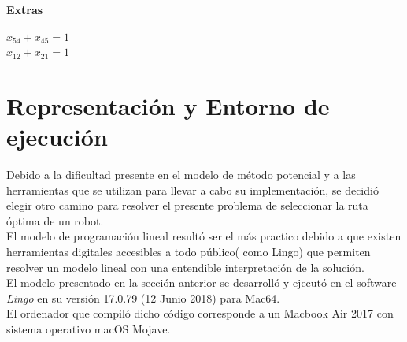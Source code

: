 \documentclass[journal, 10pt]{IEEEtran}
\begin{document}
\textbf{Extras}\\
\begin{center}
 ${x}_{54}+{x}_{45}=1$\\
 ${x}_{12}+{x}_{21}=1$\\
\end{center}
\section{Representación y Entorno de ejecución}
Debido a la dificultad presente en el modelo de método potencial y a las herramientas que se utilizan para llevar a cabo su implementación, se decidió elegir otro camino para resolver el presente problema de seleccionar la ruta óptima de un robot.\\
El modelo de programación lineal resultó ser el más practico debido a que existen herramientas digitales accesibles a todo público( como Lingo) que permiten resolver un modelo lineal con una entendible interpretación de la solución.\\
El modelo presentado en la sección anterior se desarrolló y ejecutó en el software \textit{Lingo} en su versión 17.0.79 (12 Junio 2018) para Mac64.\\
El ordenador que compiló dicho código corresponde a un Macbook Air 2017 con sistema operativo macOS Mojave.\\
\end{document}
